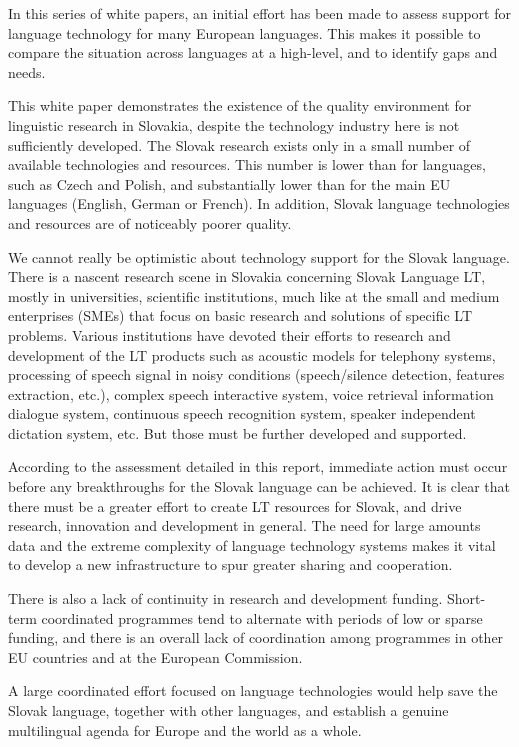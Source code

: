 In this series of white papers, an initial effort has been made to assess support for language technology for many European languages. This makes it possible to compare the situation across languages at a high-level, and to identify gaps and needs.

This white paper demonstrates the existence of the quality environment for linguistic research in Slovakia, despite the technology industry here is not sufficiently developed. The Slovak research exists only in a small number of available technologies and resources. This number is lower than for languages, such as Czech and Polish, and substantially lower than for the main EU languages (English, German or French). In addition, Slovak language technologies and resources are of noticeably poorer quality.

We cannot really be optimistic about technology support for the Slovak language. There is a nascent research scene in Slovakia concerning Slovak Language LT, mostly in universities, scientific institutions, much like at the small and medium enterprises (SMEs) that focus on basic research and solutions of specific LT problems. Various institutions have devoted their efforts to research and development of the LT products such as acoustic models for telephony systems, processing of speech signal in noisy conditions (speech/silence detection, features extraction, etc.), complex speech interactive system, voice retrieval information dialogue system, continuous speech recognition system,    speaker independent dictation system, etc. But those must be further developed and supported.

According to the assessment detailed in this report, immediate action must occur before any breakthroughs for the Slovak language can be achieved. It is clear that there must be a greater effort to create LT resources for Slovak, and drive research, innovation and development in general. The need for large amounts data and the extreme complexity of language technology systems makes it vital to develop a new infrastructure to spur greater sharing and cooperation.

There is also a lack of continuity in research and development funding. Short-term coordinated programmes tend to alternate with periods of low or sparse funding, and there is an overall lack of coordination among programmes in other EU countries and at the European Commission.

A large coordinated effort focused on language technologies would help
save the Slovak language, together with other languages, and establish a
genuine multilingual agenda for Europe and the world as a
whole.
